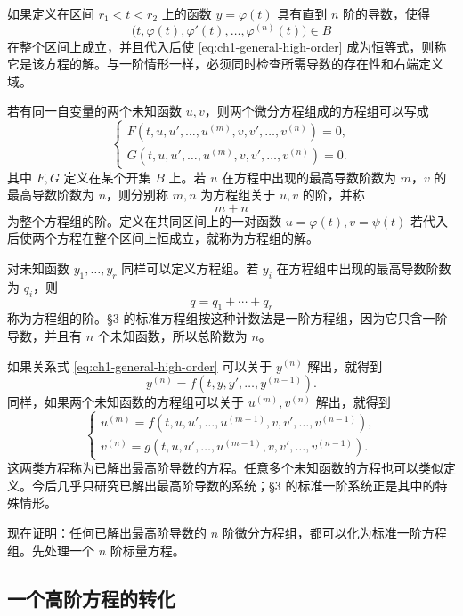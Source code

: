 如果定义在区间 \(r_1<t<r_2\) 上的函数 \(y=\varphi(t)\) 具有直到 \(n\) 阶的导数，使得
\[
 \bigl(t,\varphi(t),\varphi'(t),\ldots,\varphi^{(n)}(t)\bigr)\in B
\]
在整个区间上成立，并且代入后使 \eqref{eq:ch1-general-high-order} 成为恒等式，则称它是该方程的解。与一阶情形一样，必须同时检查所需导数的存在性和右端定义域。

若有同一自变量的两个未知函数 \(u,v\)，则两个微分方程组成的方程组可以写成
\begin{equation}
 \begin{cases}
  F(t,u,u',\ldots,u^{(m)},v,v',\ldots,v^{(n)})=0,\\
  G(t,u,u',\ldots,u^{(m)},v,v',\ldots,v^{(n)})=0.
 \end{cases}
 \label{eq:ch1-two-unknown-general}
\end{equation}
其中 \(F,G\) 定义在某个开集 \(B\) 上。若 \(u\) 在方程中出现的最高导数阶数为 \(m\)，\(v\) 的最高导数阶数为 \(n\)，则分别称 \(m,n\) 为方程组关于 \(u,v\) 的阶，并称
\[
 m+n
\]
为整个方程组的阶。定义在共同区间上的一对函数 \(u=\varphi(t),v=\psi(t)\) 若代入后使两个方程在整个区间上恒成立，就称为方程组的解。

对未知函数 \(y_1,\ldots,y_r\) 同样可以定义方程组。若 \(y_i\) 在方程组中出现的最高导数阶数为 \(q_i\)，则
\[
 q=q_1+\cdots+q_r
\]
称为方程组的阶。§3 的标准方程组按这种计数法是一阶方程组，因为它只含一阶导数，并且有 \(n\) 个未知函数，所以总阶数为 \(n\)。

如果关系式 \eqref{eq:ch1-general-high-order} 可以关于 \(y^{(n)}\) 解出，就得到
\begin{equation}
 y^{(n)}=f(t,y,y',\ldots,y^{(n-1)}).
 \label{eq:ch1-explicit-high-order}
\end{equation}
同样，如果两个未知函数的方程组可以关于 \(u^{(m)},v^{(n)}\) 解出，就得到
\begin{equation}
 \begin{cases}
  u^{(m)}
  =f(t,u,u',\ldots,u^{(m-1)},v,v',\ldots,v^{(n-1)}),\\
  v^{(n)}
  =g(t,u,u',\ldots,u^{(m-1)},v,v',\ldots,v^{(n-1)}).
 \end{cases}
 \label{eq:ch1-explicit-two-high-order}
\end{equation}
这两类方程称为已解出最高阶导数的方程。任意多个未知函数的方程也可以类似定义。今后几乎只研究已解出最高阶导数的系统；§3 的标准一阶系统正是其中的特殊情形。

现在证明：任何已解出最高阶导数的 \(n\) 阶微分方程组，都可以化为标准一阶方程组。先处理一个 \(n\) 阶标量方程。

\subsection{一个高阶方程的转化}

